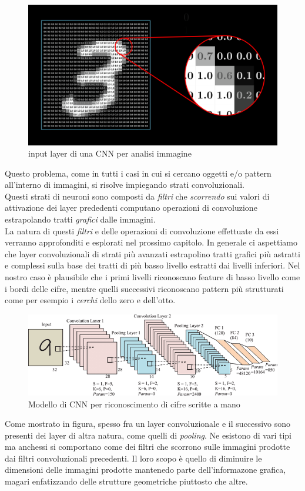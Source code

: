 \documentclass[12pt,a4paper,openright,twoside]{report}
\begin{document}
\begin{figure}[h]
\centering
\includegraphics[width=\linewidth]{pixel-values.png}
\caption{input layer di una CNN per analisi immagine}
\end{figure}
Questo problema, come in tutti i casi in cui si cercano oggetti e/o pattern all'interno di immagini, si risolve impiegando strati convoluzionali. \\
Questi strati di neuroni sono composti da \emph{filtri} che \emph{scorrendo} sui valori di attivazione dei layer prededenti computano operazioni di convoluzione estrapolando tratti \emph{grafici} dalle immagini.\\
La natura di questi \emph{filtri} e delle operazioni di convoluzione effettuate da essi verranno approfonditi e esplorati nel prossimo capitolo. 
In generale ci aspettiamo che layer convoluzionali di strati più avanzati estrapolino tratti grafici più astratti e complessi sulla base dei tratti di più basso livello estratti dai livelli inferiori. Nel nostro caso è plausibile che i primi livelli riconoscano feature di basso livello come i bordi delle cifre, mentre quelli successivi riconoscano pattern più strutturati come per esempio i \emph{cerchi} dello zero e dell'otto. 
\newpage

\begin{figure}[h]
\centering
\includegraphics[width=\linewidth]{digit_arch.png}
\caption{Modello di CNN per riconoscimento di cifre scritte a mano}
\end{figure}
Come mostrato in figura, spesso fra un layer convoluzionale e il successivo sono presenti dei layer di altra natura, come quelli di \emph{pooling}. Ne esistono di vari tipi ma anchessi si comportano come dei filtri che scorrono sulle immagini prodotte dai filtri convoluzionali precedenti. Il loro scopo è quello di diminuire le dimensioni delle immagini prodotte mantenedo parte dell'informazone grafica, magari enfatizzando delle strutture geometriche piuttosto che altre.
\end{document}

